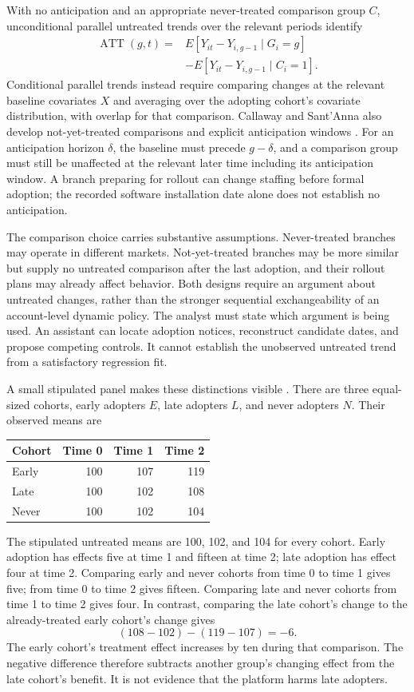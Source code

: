 With no anticipation and an appropriate never-treated comparison group $C$,
unconditional parallel untreated trends over the relevant periods identify
\begin{align*}
 \operatorname{ATT}(g,t)
 ={}&E[Y_{it}-Y_{i,g-1}\mid G_i=g]\\
 &-E[Y_{it}-Y_{i,g-1}\mid C_i=1].
\end{align*}
Conditional parallel trends instead require comparing changes at the relevant
baseline covariates $X$ and averaging over the adopting cohort's covariate
distribution, with overlap for that comparison. Callaway and Sant'Anna also
develop not-yet-treated comparisons and explicit anticipation windows
\citep{callaway2021}. For an anticipation horizon $\delta$, the baseline must
precede $g-\delta$, and a comparison group must still be unaffected at the
relevant later time including its anticipation window. A branch preparing for
rollout can change staffing before formal adoption; the recorded software
installation date alone does not establish no anticipation.

The comparison choice carries substantive assumptions. Never-treated branches
may operate in different markets. Not-yet-treated branches may be more similar
but supply no untreated comparison after the last adoption, and their rollout
plans may already affect behavior. Both designs require an argument about
untreated changes, rather than the stronger sequential exchangeability of an
account-level dynamic policy. The analyst must state which argument is being
used. An assistant can locate adoption notices, reconstruct candidate dates,
and propose competing controls. It cannot establish the unobserved untreated
trend from a satisfactory regression fit.

A small stipulated panel makes these distinctions visible
\citep{exec14_workflow_oracle}. There are three equal-sized cohorts, early
adopters $E$, late adopters $L$, and never adopters $N$. Their observed means are
\begin{center}
\begin{tabular}{lrrr}
\toprule
Cohort & Time 0 & Time 1 & Time 2\\
\midrule
Early &100&107&119\\
Late &100&102&108\\
Never &100&102&104\\
\bottomrule
\end{tabular}
\end{center}
The stipulated untreated means are 100, 102, and 104 for every cohort.
Early adoption has effects five at time 1 and fifteen at time 2; late adoption
has effect four at time 2. Comparing early and never cohorts from time 0 to
time 1 gives five; from time 0 to time 2 gives fifteen. Comparing late and
never cohorts from time 1 to time 2 gives four. In contrast, comparing the
late cohort's change to the already-treated early cohort's change gives
\[
 (108-102)-(119-107)=-6.
\]
The early cohort's treatment effect increases by ten during that comparison.
The negative difference therefore subtracts another group's changing effect
from the late cohort's benefit. It is not evidence that the platform harms
late adopters.

